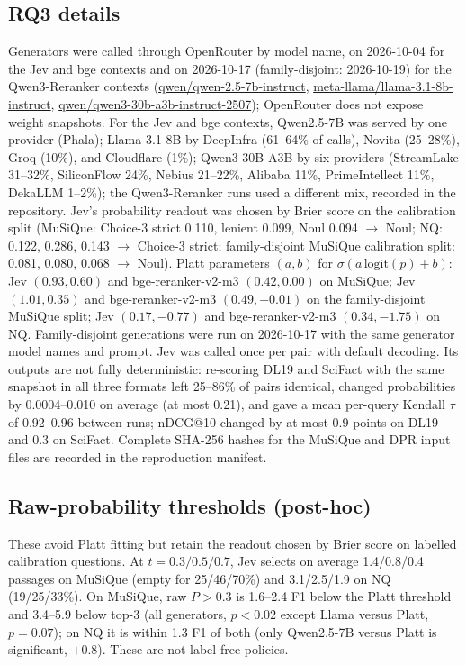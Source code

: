 \subsection{RQ3 details}\label{app:extra}
Generators were called through OpenRouter by model name, on 2026-10-04 for the Jev and bge contexts and on 2026-10-17 (family-disjoint: 2026-10-19) for the Qwen3-Reranker contexts (\url{qwen/qwen-2.5-7b-instruct}, \url{meta-llama/llama-3.1-8b-instruct}, \url{qwen/qwen3-30b-a3b-instruct-2507}); OpenRouter does not expose weight snapshots. For the Jev and bge contexts, Qwen2.5-7B was served by one provider (Phala); Llama-3.1-8B by DeepInfra (61--64\% of calls), Novita (25--28\%), Groq (10\%), and Cloudflare (1\%); Qwen3-30B-A3B by six providers (StreamLake 31--32\%, SiliconFlow 24\%, Nebius 21--22\%, Alibaba 11\%, PrimeIntellect 11\%, DekaLLM 1--2\%); the Qwen3-Reranker runs used a different mix, recorded in the repository.
Jev's probability readout was chosen by Brier score on the calibration split (MuSiQue: Choice-3 strict 0.110, lenient 0.099, Noul 0.094 $\rightarrow$ Noul; NQ: 0.122, 0.286, 0.143 $\rightarrow$ Choice-3 strict; family-disjoint MuSiQue calibration split: 0.081, 0.080, 0.068 $\rightarrow$ Noul). Platt parameters $(a,b)$ for $\sigma(a\,\mathrm{logit}(p)+b)$: Jev $(0.93, 0.60)$ and bge-reranker-v2-m3 $(0.42, 0.00)$ on MuSiQue; Jev $(1.01, 0.35)$ and bge-reranker-v2-m3 $(0.49, -0.01)$ on the family-disjoint MuSiQue split; Jev $(0.17, -0.77)$ and bge-reranker-v2-m3 $(0.34, -1.75)$ on NQ. Family-disjoint generations were run on 2026-10-17 with the same generator model names and prompt. Jev was called once per pair with default decoding. Its outputs are not fully deterministic: re-scoring DL19 and SciFact with the same snapshot in all three formats left 25--86\% of pairs identical, changed probabilities by 0.0004--0.010 on average (at most 0.21), and gave a mean per-query Kendall $\tau$ of 0.92--0.96 between runs; nDCG@10 changed by at most 0.9 points on DL19 and 0.3 on SciFact. Complete SHA-256 hashes for the MuSiQue and DPR input files are recorded in the reproduction manifest.

\subsection{Raw-probability thresholds (post-hoc)}
These avoid Platt fitting but retain the readout chosen by Brier score on labelled calibration questions. At $t=0.3/0.5/0.7$, Jev selects on average 1.4/0.8/0.4 passages on MuSiQue (empty for 25/46/70\%) and 3.1/2.5/1.9 on NQ (19/25/33\%). On MuSiQue, raw $P>0.3$ is 1.6--2.4 F1 below the Platt threshold and 3.4--5.9 below top-3 (all generators, $p<0.02$ except Llama versus Platt, $p=0.07$); on NQ it is within 1.3 F1 of both (only Qwen2.5-7B versus Platt is significant, $+0.8$). These are not label-free policies.


